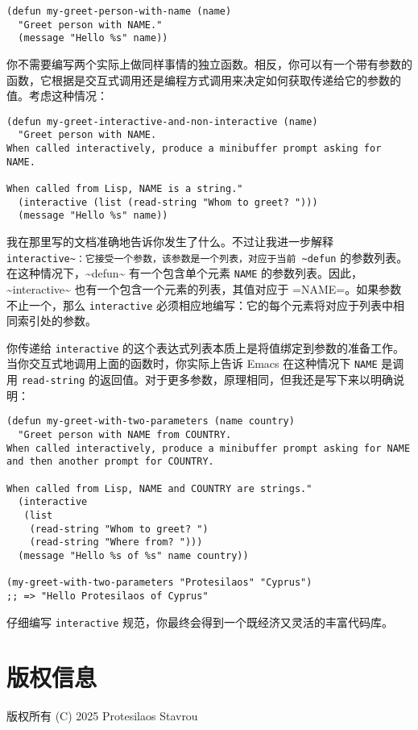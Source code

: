 \documentclass[11pt]{ctexart}
\begin{document}
\begin{verbatim}
(defun my-greet-person-with-name (name)
  "Greet person with NAME."
  (message "Hello %s" name))
\end{verbatim}

你不需要编写两个实际上做同样事情的独立函数。相反，你可以有一个带有参数的函数，它根据是交互式调用还是编程方式调用来决定如何获取传递给它的参数的值。考虑这种情况：

\begin{verbatim}
(defun my-greet-interactive-and-non-interactive (name)
  "Greet person with NAME.
When called interactively, produce a minibuffer prompt asking for NAME.

When called from Lisp, NAME is a string."
  (interactive (list (read-string "Whom to greet? ")))
  (message "Hello %s" name))
\end{verbatim}

我在那里写的文档准确地告诉你发生了什么。不过让我进一步解释 \texttt{interactive\textasciitilde{}：它接受一个参数，该参数是一个列表，对应于当前 \textasciitilde{}defun} 的参数列表。在这种情况下，\textasciitilde{}defun\textasciitilde{} 有一个包含单个元素 \texttt{NAME} 的参数列表。因此，\textasciitilde{}interactive\textasciitilde{} 也有一个包含一个元素的列表，其值对应于 =NAME=。如果参数不止一个，那么 \texttt{interactive} 必须相应地编写：它的每个元素将对应于列表中相同索引处的参数。

你传递给 \texttt{interactive} 的这个表达式列表本质上是将值绑定到参数的准备工作。当你交互式地调用上面的函数时，你实际上告诉 Emacs 在这种情况下 \texttt{NAME} 是调用 \texttt{read-string} 的返回值。对于更多参数，原理相同，但我还是写下来以明确说明：

\begin{verbatim}
(defun my-greet-with-two-parameters (name country)
  "Greet person with NAME from COUNTRY.
When called interactively, produce a minibuffer prompt asking for NAME
and then another prompt for COUNTRY.

When called from Lisp, NAME and COUNTRY are strings."
  (interactive
   (list
    (read-string "Whom to greet? ")
    (read-string "Where from? ")))
  (message "Hello %s of %s" name country))

(my-greet-with-two-parameters "Protesilaos" "Cyprus")
;; => "Hello Protesilaos of Cyprus"
\end{verbatim}

仔细编写 \texttt{interactive} 规范，你最终会得到一个既经济又灵活的丰富代码库。
\section{版权信息}
\label{sec:orgb1d6db4}
版权所有 (C) 2025 Protesilaos Stavrou
\end{document}
